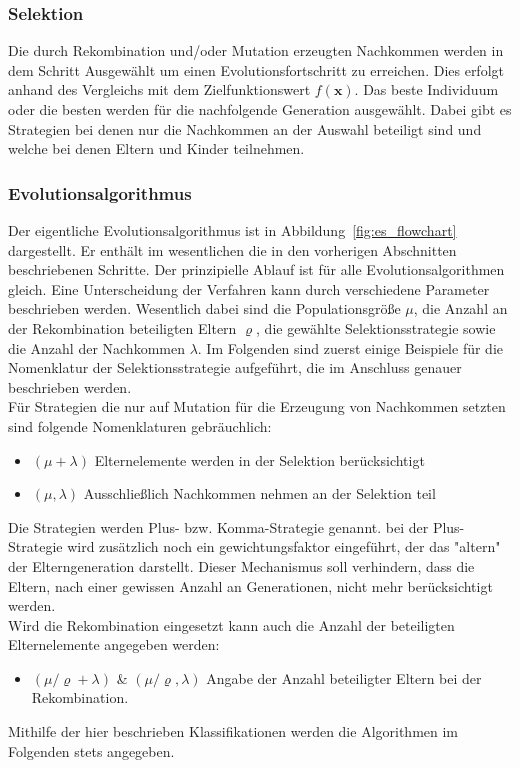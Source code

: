 \subsubsection[Selektion]{Selektion}
Die durch Rekombination und/oder Mutation erzeugten Nachkommen werden in dem Schritt Ausgewählt um einen Evolutionsfortschritt zu erreichen. Dies erfolgt anhand des Vergleichs mit dem Zielfunktionswert $f(\mathbf{x})$. Das beste Individuum oder die besten werden für die nachfolgende Generation ausgewählt. Dabei gibt es Strategien bei denen nur die Nachkommen an der Auswahl beteiligt sind und welche bei denen Eltern und Kinder teilnehmen.

\subsubsection{Evolutionsalgorithmus}
%
Der eigentliche Evolutionsalgorithmus ist in Abbildung~\ref{fig:es_flowchart} dargestellt. Er enthält im wesentlichen die in den vorherigen Abschnitten beschriebenen Schritte. Der prinzipielle Ablauf ist für alle Evolutionsalgorithmen gleich. Eine Unterscheidung der Verfahren kann durch verschiedene Parameter beschrieben werden. Wesentlich dabei sind die Populationsgröße $\mu$, die Anzahl an der Rekombination beteiligten Eltern $\varrho$, die gewählte Selektionsstrategie sowie die Anzahl der Nachkommen $\lambda$. Im Folgenden sind zuerst einige Beispiele für die Nomenklatur der Selektionsstrategie aufgeführt, die im Anschluss genauer beschrieben werden.\\
Für Strategien die nur auf Mutation für die Erzeugung von Nachkommen setzten sind folgende Nomenklaturen gebräuchlich:
\begin{itemize}
\item $(\mu+\lambda)$ Elternelemente werden in der Selektion berücksichtigt
\item $(\mu,\lambda)$ Ausschließlich Nachkommen nehmen an der Selektion teil
\end{itemize}
%
Die Strategien werden Plus- bzw. Komma-Strategie genannt. bei der Plus-Strategie wird zusätzlich noch ein gewichtungsfaktor eingeführt, der das "altern" der Elterngeneration darstellt. Dieser Mechanismus soll verhindern, dass die Eltern, nach einer gewissen Anzahl an Generationen, nicht mehr berücksichtigt werden.\\
Wird die Rekombination eingesetzt kann auch die Anzahl der beteiligten Elternelemente angegeben werden:
\begin{itemize}
\item $({\mu}/{\varrho}+\lambda)$ \& $({\mu}/{\varrho},\lambda)$ Angabe der Anzahl beteiligter Eltern bei der Rekombination.
\end{itemize}
%
Mithilfe der hier beschrieben Klassifikationen werden die Algorithmen im Folgenden stets angegeben.\\


